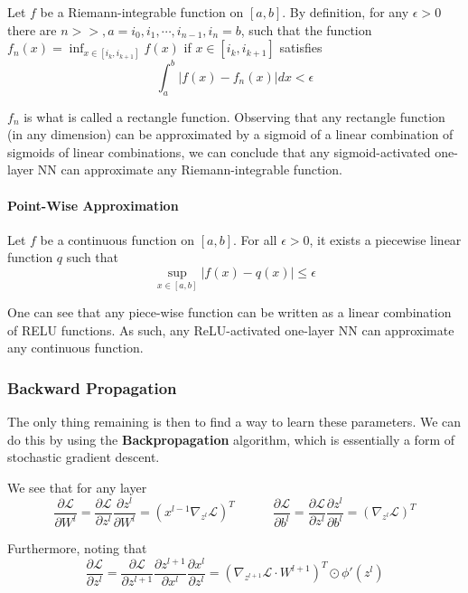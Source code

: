 \documentclass{article}
\newcommand{\loss}{\mathcal{L}}
\begin{document}
Let $f$ be a Riemann-integrable function on $[a,b]$.
By definition, for any $\epsilon > 0$ there are $n >> , a = i_0, i_1, \cdots, i_{n-1}, i_n = b$, such that the function $f_n(x) = \inf_{x \in [i_k, i_{k+1}]} f(x)$ if $x \in [i_k, i_{k+1}]$ satisfies
$$
\int_a^b |f(x) - f_n(x)| dx < \epsilon
$$

$f_n$ is what is called a rectangle function.
Observing that any rectangle function (in any dimension) can be approximated by a sigmoid of a linear combination of sigmoids of linear combinations, we can conclude that any sigmoid-activated one-layer NN can approximate any Riemann-integrable function.

\paragraph{Point-Wise Approximation}

Let $f$ be a continuous function on $[a,b]$.
For all $\epsilon > 0$, it exists a piecewise linear function $q$ such that
$$
\sup_{x \in [a, b]} |f(x) - q(x)| \leq \epsilon
$$

One can see that any piece-wise function can be written as a linear combination of RELU functions.
As such, any ReLU-activated one-layer NN can approximate any continuous function.

\subsubsection{Backward Propagation}

The only thing remaining is then to find a way to learn these parameters.
We can do this by using the \textbf{Backpropagation} algorithm, which is essentially a form of stochastic gradient descent.

We see that for any layer
$$
\frac{\partial \loss}{\partial W^l} = 
\frac{\partial \loss}{\partial z^l} \frac{\partial z^l}{\partial W^l} =
(x^{l-1} \nabla_{z^l} \loss)^T
\quad \quad \quad
\frac{\partial \loss}{\partial b^l} = 
\frac{\partial \loss}{\partial z^l} \frac{\partial z^l}{\partial b^l} =
(\nabla_{z^l} \loss)^T
$$

Furthermore, noting that
$$
\frac{\partial \loss}{\partial z^l} =
\frac{\partial \loss}{\partial z^{l+1}} \frac{\partial z^{l+1}}{\partial x^l} \frac{\partial x^l}{\partial z^l} =
\left( \nabla_{z^{l+1}} \loss \cdot W^{l+1} \right)^T \odot \phi'(z^l)
$$
\end{document}

